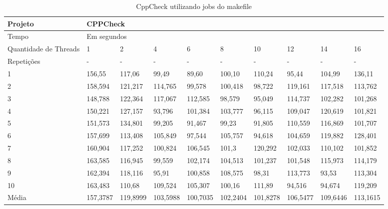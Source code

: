 \begin{table}[h]
\centering
\begin{tabular}{|p{1cm}|p{1.4cm}|p{1.4cm}|p{1.4cm}|p{1.4cm}|p{1.4cm}|p{1.4cm}|p{1.4cm}|p{1.4cm}|p{1.4cm}|}
\hline
Projeto               & \multicolumn{9}{l|}{CPPCheck}        \\ \hline
Tempo                 & \multicolumn{9}{l|}{Em segundos}      \\ \hline
Quantidade de Threads & 1 & 2 & 4 & 6 & 8 & 10 & 12 & 14 & 16 \\ \hline
Repetições            & - & - & - & - & - & -  & -  & -  & -  \\ \hline
1 & 156,55  &  117,06  &  99,49   &  89,60    & 100,10   & 110,24  & 95,44     & 104,99   & 136,11 \\ \hline
2 & 158,594 &  121,217 &  114,765 &  99,578   & 100,418  & 98,722  & 119,161   & 117,518  & 113,762 \\ \hline
3 & 148,788 &  122,364 &  117,067 &  112,585  & 98,579   & 95,049  & 114,737   & 102,282  & 101,268 \\ \hline
4 & 150,221 &  127,157 &  93,796  &  101,384  & 103,777  & 96,115  & 109,047   & 120,619  & 101,821 \\ \hline
5 & 151,573 &  134,801 &  99,205  &  91,467   & 99,23    & 91,805  & 110,559   & 116,869  & 101,707 \\ \hline
6 & 157,699 &  113,408 &  105,849 &  97,544   & 105,757  & 94,618  & 104,659   & 119,882  & 128,401 \\ \hline
7 & 160,904 &  117,252 &  100,824 &  106,545  & 101,3    & 120,292 & 102,033   & 110,102  & 101,852 \\ \hline
8 & 163,585 &  116,945 &  99,559  &  102,174  & 104,513  & 101,237 & 101,548   & 115,973  & 114,179 \\ \hline
9 & 162,394 &  118,116 &  95,91   &  100,858  & 108,575  & 98,31   & 113,773   & 93,53    & 113,304 \\ \hline
10& 163,483 &  110,68  &  109,524 &  105,307  & 100,16   & 111,89  & 94,516    & 94,674   & 119,209 \\ \hline
Média& 157,3787&  119,8999&  103,5988&  100,7035 & 102,2404 & 101,8278&  106,5477 & 109,6446 & 113,1615 \\ \hline
\end{tabular}
\caption{CppCheck utilizando jobs do makefile}
\label{tab:cppcheck}
\end{table}


